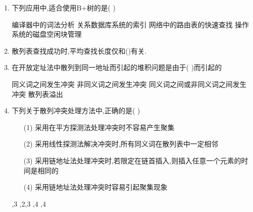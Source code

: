 \documentclass[12pt, a4paper, oneside, UTF8]{ctexbook}
\begin{document}
\begin{enumerate}
    \item \bl 下列应用中,适合使用B+树的是(   ) 
    \begin{choices}[2]
        \task 编译器中的词法分析
        \task 关系数据库系统的索引
        \task 网络中的路由表的快速查找
        \task 操作系统的磁盘空闲块管理
    \end{choices}


    \item 散列表查找成功时,平均查找长度仅和()有关. 
    \item 在开放定址法中散列到同一地址而引起的堆积问题是由于(   )而引起的
    \begin{choices}[2]
        \task 同义词之间发生冲突
        \task 非同义词之间发生冲突
        \task 同义词之间或非同义词之间发生冲突 
        \task 散列表溢出 
    \end{choices}


    \item 下列关于散列冲突处理方法中,正确的是(   ) 
    \begin{enumerate}
        \item [(1)] 采用在平方探测法处理冲突时不容易产生聚集
        \item [(2)] 采用线性探测法解决冲突时,所有同义词在散列表中一定相邻
        \item [(3)] 采用链地址法处理冲突时,若限定在链首插入,则插入任意一个元素的时间是相同的 
        \item [(4)] 采用链地址法处理冲突时容易引起聚集现象
    \end{enumerate}

    \begin{choices}
        ,3 ,2,3 ,4 ,4
    \end{choices}


\end{enumerate}
\end{document}
